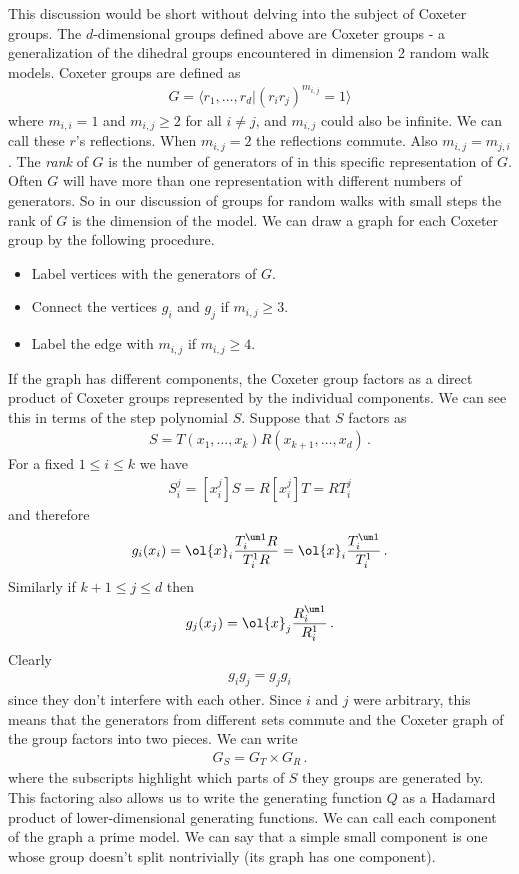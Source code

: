 This discussion would be short without delving into the subject of Coxeter groups. The $d$-dimensional groups defined above are Coxeter groups - a generalization of the dihedral groups encountered in dimension 2 random walk models. Coxeter groups are defined as
\begin{align}
	G = \langle r_1,\ldots, r_d |(r_ir_j)^{m_{i,j}} = 1\rangle
\end{align}
where $m_{i,i} = 1$ and $m_{i,j} \ge 2$ for all $i\neq j$, and $m_{i,j}$ could also be infinite. We can call these $r$'s reflections. When $m_{i,j} = 2$ the reflections commute. Also $m_{i,j} = m_{j,i}$. The \emph{rank} of $G$ is the number of generators of in this specific representation of $G$. Often $G$ will have more than one representation with different numbers of generators. So in our discussion of groups for random walks with small steps the rank of $G$ is the dimension of the model. We can draw a graph for each Coxeter group by the following procedure.
\begin{itemize}
\item Label vertices with the generators of $G$.
\item Connect the vertices $g_i$ and $g_j$ if $m_{i,j} \ge 3$.
\item Label the edge with $m_{i,j}$ if $m_{i,j}\ge 4$.
\end{itemize}
If the graph has different components, the Coxeter group factors as a direct product of Coxeter groups represented by the individual components. We can see this in terms of the step polynomial $S$. Suppose that $S$ factors as
\begin{align}
	S = T(x_1,\ldots,x_k)R(x_{k+1},\ldots,x_d)\,.
\end{align}
For a fixed $1 \leq i \leq k$ we have
\begin{align}
	S_i^j = [x_i^j]S = R[x_i^j]T = R T_i^j
\end{align}
and therefore
\begin{align}
	g_i(x_i) = \ol{x}_i\frac{T_i^{\um 1}R}{T_i^1R} = \ol{x}_i\frac{T_i^{\um 1}}{T_i^1}\,.
\end{align}
Similarly if $k+1\leq j\leq d$ then
\begin{align}
	g_j(x_j) = \ol{x}_j\frac{R_i^{\um 1}}{R_i^1}\,.
\end{align}
Clearly
\begin{align}
	g_ig_j = g_jg_i
\end{align}
since they don't interfere with each other. Since $i$ and $j$ were arbitrary, this means that the generators from different sets commute and the Coxeter graph of the group factors into two pieces. We can write
\begin{align}
	G_S = G_T \times G_R\,.
\end{align}
where the subscripts highlight which parts of $S$ they groups are generated by. This factoring also allows us to write the generating function $Q$ as a Hadamard product of lower-dimensional generating functions. We can call each component of the graph a prime model. We can say that a simple small component is one whose group doesn't split nontrivially (its graph has one component).

